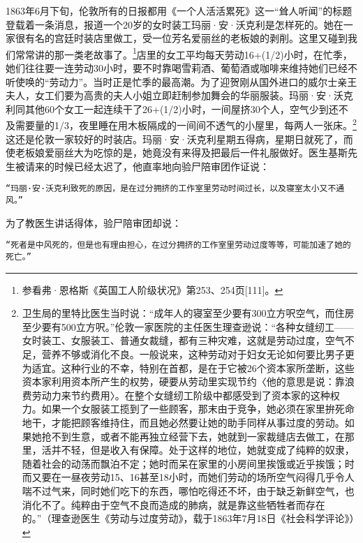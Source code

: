 \documentclass{ctexbook}
\begin{document}
    1863年6月下旬，伦敦所有的日报都用《一个人活活累死》这一“耸人听闻”的标题登载着一条消息，报道一个20岁的女时装工玛丽·安·沃克利是怎样死的。她在一家很有名的宫廷时装店里做工，受一位芳名爱丽丝的老板娘的剥削。这里又碰到我们常常讲的那一类老故事了。\footnote{参看弗·恩格斯《英国工人阶级状况》第253、254页[111]。}店里的女工平均每天劳动16+(1/2)小时，在忙季，她们往往要一连劳动30小时，要不时靠喝雪莉酒、葡萄酒或咖啡来维持她们已经不听使唤的“劳动力”。当时正是忙季的最高潮。为了迎贺刚从国外进口的威尔士亲王夫人，女工们要为高贵的夫人小姐立即赶制参加舞会的华丽服装。玛丽·安·沃克利同其他60个女工一起连续干了26+(1/2)小时，一间屋挤30个人，空气少到还不及需要量的1/3，夜里睡在用木板隔成的一间间不透气的小屋里，每两人一张床。\footnote{卫生局的里特比医生当时说：“成年人的寝室至少要有300立方呎空气，而住房至少要有500立方呎。”伦敦一家医院的主任医生理查逊说：“各种女缝纫工——女时装工、女服装工、普通女裁缝，都有三种灾难，这就是劳动过度，空气不足，营养不够或消化不良。一般说来，这种劳动对于妇女无论如何要比男子更为适宜。这种行业的不幸，特别在首都，是在于它被26个资本家所垄断，这些资本家利用资本所产生的权势，硬要从劳动里实现节约〈他的意思是说：靠浪费劳动力来节约费用〉。在整个女缝纫工阶级中都感受到了资本家的这种权力。如果一个女服装工揽到了一些顾客，那末由于竞争，她必须在家里拚死命地干，才能把顾客维持住，而且她必然要让她的助手同样从事过度的劳动。如果她抢不到生意，或者不能再独立经营下去，她就到一家裁缝店去做工，在那里，活并不轻，但是收入有保障。处于这样的地位，她就变成了纯粹的奴隶，随着社会的动荡而飘泊不定；她时而呆在家里的小房间里挨饿或近乎挨饿；时而又要在一昼夜劳动15、16甚至18小时，而她们劳动的场所空气闷得几乎令人喘不过气来，同时她们吃下的东西，哪怕吃得还不坏，由于缺乏新鲜空气，也消化不了。纯粹由于空气不良而造成的肺病，就是靠这些牺牲者而存在的。”（理查逊医生《劳动与过度劳动》，载于1863年7月18日《社会科学评论》）}这还是伦敦一家较好的时装店。玛丽·安·沃克利星期五得病，星期日就死了，而使老板娘爱丽丝大为吃惊的是，她竟没有来得及把最后一件礼服做好。医生基斯先生被请来的时候已经太迟了，他直率地向验尸陪审团作证说：

    \texttt{“玛丽·安·沃克利致死的原因，是在过分拥挤的工作室里劳动时间过长，以及寝室太小又不通风。”}

    为了教医生讲话得体，验尸陪审团却说：

    \texttt{“死者是中风死的，但是也有理由担心，在过分拥挤的工作室里劳动过度等等，可能加速了她的死亡。”}
\end{document}

